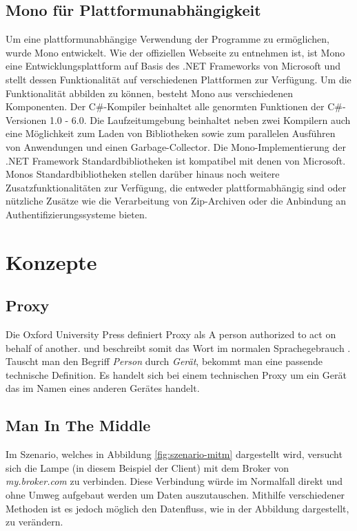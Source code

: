     \subsection{Mono für Plattformunabhängigkeit}
        Um eine plattformunabhängige Verwendung der Programme zu ermöglichen, wurde Mono entwickelt.
        Wie der offiziellen Webseite \cite{mono_project_2018} zu entnehmen ist, ist Mono eine Entwicklungsplattform auf Basis des .NET Frameworks von Microsoft und stellt dessen Funktionalität auf verschiedenen Plattformen zur Verfügung. Um die Funktionalität abbilden zu können, besteht Mono aus verschiedenen Komponenten.
        Der C\#-Kompiler beinhaltet alle genormten Funktionen der C\#-Versionen 1.0 - 6.0.
        Die Laufzeitumgebung beinhaltet neben zwei Kompilern auch eine Möglichkeit zum Laden von Bibliotheken sowie zum parallelen Ausführen von Anwendungen und einen Garbage-Collector.
        Die Mono-Implementierung der .NET Framework Standardbibliotheken ist kompatibel mit denen von Microsoft.
        Monos Standardbibliotheken stellen darüber hinaus noch weitere Zusatzfunktionalitäten zur Verfügung, die entweder plattformabhängig sind oder nützliche Zusätze wie die Verarbeitung von Zip-Archiven oder die Anbindung an Authentifizierungssysteme bieten.

\section{Konzepte} \label{TechKonzepte}
    \subsection{Proxy}
    Die Oxford University Press definiert Proxy als \glqq A person authorized to act on behalf of another.\grqq{} und beschreibt somit das Wort im normalen Sprachegebrauch \cite{oxford_university_press_2019}.
    Tauscht man den Begriff \emph{Person} durch \emph{Gerät}, bekommt man eine passende technische Definition. Es handelt sich bei einem technischen Proxy um ein Gerät das im Namen eines anderen Gerätes handelt.

    \subsection{Man In The Middle}
        Im Szenario, welches in Abbildung \ref{fig:szenario-mitm} dargestellt wird, versucht sich die Lampe (in diesem Beispiel der Client) mit dem Broker von \emph{my.broker.com} zu verbinden. Diese Verbindung würde im Normalfall direkt und ohne Umweg aufgebaut werden um Daten auszutauschen. Mithilfe verschiedener Methoden ist es jedoch möglich den Datenfluss, wie in der Abbildung dargestellt, zu verändern.
        

